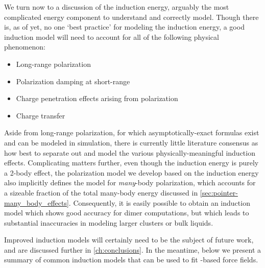 We turn now to a discussion of the \sapt induction energy, arguably the most
complicated energy component to understand and correctly model. Though there
is, as of yet, no one `best practice' for modeling the \sapt induction energy, a good
induction model will need to account for all of the following physical phenomenon:
\begin{itemize}
\item Long-range polarization
\item Polarization damping at short-range
\item Charge penetration effects arising from polarization
\item Charge transfer
\end{itemize}
Aside from long-range polarization, for which asymptotically-exact formulas
exist and can be modeled in simulation,\cite{Rick2002,Holt2008,Misquitta2007a,Misquitta2008b} 
there is currently little literature consensus as how best to separate out and
model the various physically-meaningful induction effects. Complicating matters further,
even though the \sapt induction energy is purely a 2-body effect, the
polarization model we develop based on the induction energy also implicitly defines
the model for \emph{many}-body polarization, which accounts for a sizeable
fraction of the total many-body energy discussed in
\cref{sec:pointer-many_body_effects}.
Consequently, it is easily possible to obtain an induction model which shows good
accuracy for dimer computations, but which leads to substantial inaccuracies
in modeling larger clusters or bulk liquids.

Improved induction models will certainly need to be the subject of future work,
and are discussed further in \cref{ch:conclusions}. In the meantime, below we present a summary of
common induction models that can be used to fit \sapt-based force fields.

